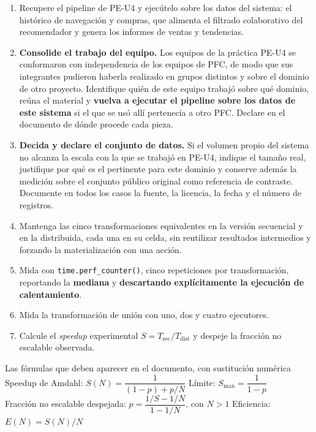 \documentclass[11pt,a4paper]{article}
\begin{document}
	\begin{enumerate}[leftmargin=*,itemsep=4pt]
		\item Recupere el pipeline de PE-U4 y ejecútelo sobre los datos del sistema: el histórico de navegación y compras, que alimenta el filtrado colaborativo del recomendador y genera los informes de ventas y tendencias.
		\item \textbf{Consolide el trabajo del equipo.} Los equipos de la práctica PE-U4 se conformaron con independencia de los equipos de PFC, de modo que sus integrantes pudieron haberla realizado en grupos distintos y sobre el dominio de otro proyecto. Identifique quién de este equipo trabajó sobre qué dominio, reúna el material y \textbf{vuelva a ejecutar el pipeline sobre los datos de este sistema} si el que se usó allí pertenecía a otro PFC. Declare en el documento de dónde procede cada pieza.
		\item \textbf{Decida y declare el conjunto de datos.} Si el volumen propio del sistema no alcanza la escala con la que se trabajó en PE-U4, indique el tamaño real, justifique por qué es el pertinente para este dominio y conserve además la medición sobre el conjunto público original como referencia de contraste. Documente en todos los casos la fuente, la licencia, la fecha y el número de registros.
		\item Mantenga las cinco transformaciones equivalentes en la versión secuencial y en la distribuida, cada una en su celda, sin reutilizar resultados intermedios y forzando la materialización con una acción.
		\item Mida con \texttt{time.perf\_counter()}, cinco repeticiones por transformación, reportando la \textbf{mediana} y \textbf{descartando explícitamente la ejecución de calentamiento}.
		\item Mida la transformación de unión con uno, dos y cuatro ejecutores.
		\item Calcule el \emph{speedup} experimental $S = T_{\text{sec}} / T_{\text{dist}}$ y despeje la fracción no escalable observada.
	\end{enumerate}
	
	\begin{defBox}{Las fórmulas que deben aparecer en el documento, con sustitución numérica}
		Speedup de Amdahl: $S(N) = \dfrac{1}{(1-p) + p/N}$ \qquad Límite: $S_{\max} = \dfrac{1}{1-p}$\\[4pt]
		Fracción no escalable despejada: $p = \dfrac{1/S - 1/N}{1 - 1/N}$, con $N>1$ \qquad Eficiencia: $E(N) = S(N)/N$
	\end{defBox}
	
\end{document}
